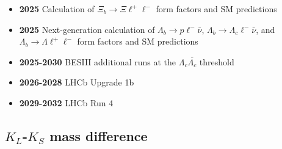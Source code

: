 \documentclass[12pt,hyperpdf]{article}
\begin{document}
\begin{itemize}
\begin{itemize}
   \item{\bf 2025} Calculation of $\Xi_b\to\Xi\ell^+\ell^-$ form factors and SM predictions
   \item{\bf 2025} Next-generation calculation of $\Lambda_b\to p\ell^-\bar{\nu}$, $\Lambda_b\to \Lambda_c\ell^-\bar{\nu}$, and  $\Lambda_b \to \Lambda \ell^+\ell^-$ form factors and SM predictions
   \item{\bf 2025-2030} BESIII additional runs at the $\Lambda_c\overline{\Lambda_c}$ threshold
   \item{\bf 2026-2028} LHCb Upgrade 1b
   \item{\bf 2029-2032} LHCb Run 4
\end{itemize}
\end{itemize}

\subsection{$K_L$-$K_S$ mass difference}
\end{document}
